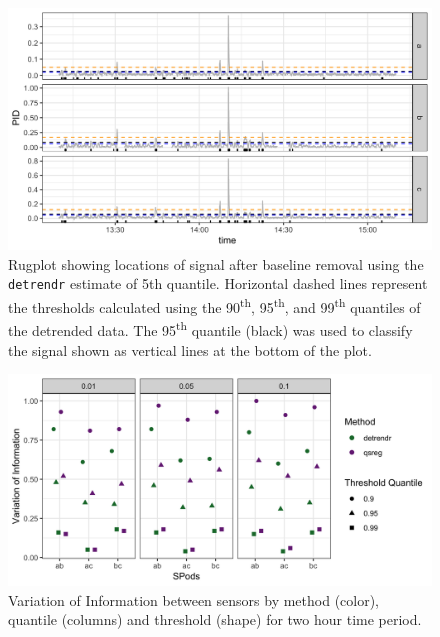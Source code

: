 \documentclass[aoas]{imsart}
\begin{document}
\begin{figure}
	\includegraphics[width = \linewidth]{Figures/corrected_rugplot.png}
	\caption{Rugplot showing locations of signal after baseline removal using the \texttt{detrendr} estimate of 5th quantile. Horizontal dashed lines represent the thresholds calculated using the 90\textsuperscript{th}, 95\textsuperscript{th}, and 99\textsuperscript{th} quantiles of the detrended data. The 95\textsuperscript{th} quantile (black) was used to classify the signal shown as vertical lines at the bottom of the plot.} 
	\label{fig:rugplot}
\end{figure}



\begin{figure}
	\centering
	\includegraphics[width = 1\linewidth]{Figures/VI_app_short.png}
	\caption{Variation of Information between sensors by method (color), quantile (columns) and threshold (shape) for two hour time period. }
	\label{fig:vi}
\end{figure}
\end{document}
